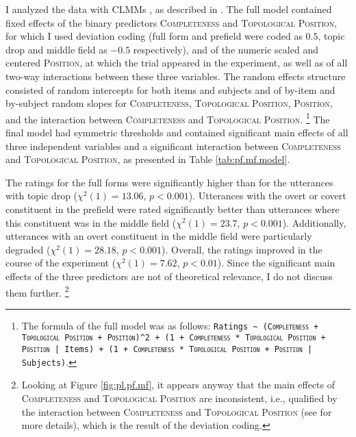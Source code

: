 \noindent
I analyzed the data with CLMMs \citep{christensen2019}, as described in .
The full model contained fixed effects of the binary predictors \textsc{Completeness} and \textsc{Topological Position}, for which I used deviation coding (full form and prefield were coded as $0.5$, topic drop and middle field as $-0.5$ respectively), and of the numeric scaled and centered \textsc{Position}, at which the trial appeared in the experiment, as well as of all two-way interactions between these three variables.
The random effects structure consisted of random intercepts for both items and subjects and of by-item and by-subject random slopes for \textsc{Completeness}, \textsc{Topological Position}, \textsc{Position}, and the interaction between \textsc{Completeness} and \textsc{Topological Position}.%
\footnote{The formula of the full model was as follows: \texttt{Ratings \textasciitilde ~(\textsc{Completeness} + \textsc{Topological Position} + \textsc{Position})\textasciicircum2 + (1 + \textsc{Completeness} * \textsc{Topological Position} + \textsc{Position} | Items) + (1 + \textsc{Completeness} * \textsc{Topological Position} + \textsc{Position} | Subjects)}.}
%
The final model had symmetric thresholds and contained significant main effects of all three independent variables and a significant interaction between \textsc{Completeness} and \textsc{Topological Position}, as presented in Table \ref{tab:pf.mf.model}.

The ratings for the full forms were significantly higher than for the utterances with topic drop ($\chi^2(1) = 13.06$, $p < 0.001$).
Utterances with the overt or covert constituent in the prefield were rated significantly better than utterances where this constituent was in the middle field ($\chi^2(1) = 23.7$, $p < 0.001$).
Additionally, utterances with an overt constituent in the middle field were particularly degraded ($\chi^2(1) = 28.18$, $p < 0.001$).
Overall, the ratings improved in the course of the experiment ($\chi^2(1) = 7.62$, $p < 0.01$).
Since the significant main effects of the three predictors are not of theoretical relevance, I do not discuss them further.%
\footnote{Looking at Figure \ref{fig:pl.pf.mf}, it appears anyway that the main effects of \textsc{Completeness} and \textsc{Topological Position} are inconsistent, i.e., qualified by the interaction between \textsc{Completeness} and \textsc{Topological Position} (see \cite{crump.etal2019} for more details), which is the result of the deviation coding.}
%

